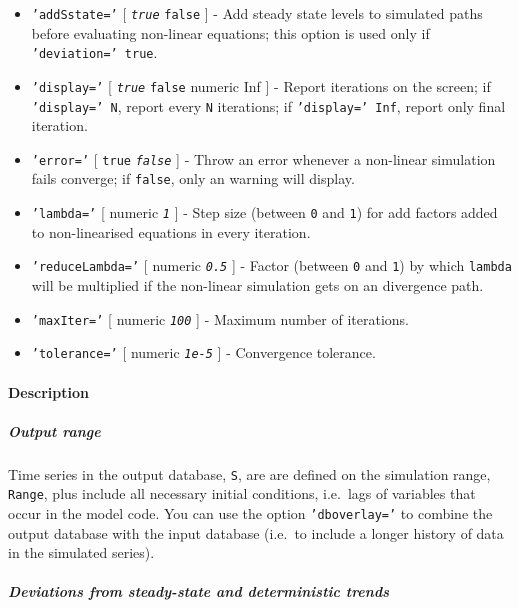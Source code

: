 \begin{itemize}
\item
  \texttt{'addSstate='} {[} \emph{\texttt{true}} \textbar{}
  \texttt{false} {]} - Add steady state levels to simulated paths before
  evaluating non-linear equations; this option is used only if
  \texttt{'deviation=' true}.
\item
  \texttt{'display='} {[} \emph{\texttt{true}} \textbar{} \texttt{false}
  \textbar{} numeric \textbar{} Inf {]} - Report iterations on the
  screen; if \texttt{'display=' N}, report every \texttt{N} iterations;
  if \texttt{'display=' Inf}, report only final iteration.
\item
  \texttt{'error='} {[} \texttt{true} \textbar{} \emph{\texttt{false}}
  {]} - Throw an error whenever a non-linear simulation fails converge;
  if \texttt{false}, only an warning will display.
\item
  \texttt{'lambda='} {[} numeric \textbar{} \emph{\texttt{1}} {]} - Step
  size (between \texttt{0} and \texttt{1}) for add factors added to
  non-linearised equations in every iteration.
\item
  \texttt{'reduceLambda='} {[} numeric \textbar{} \emph{\texttt{0.5}}
  {]} - Factor (between \texttt{0} and \texttt{1}) by which
  \texttt{lambda} will be multiplied if the non-linear simulation gets
  on an divergence path.
\item
  \texttt{'maxIter='} {[} numeric \textbar{} \emph{\texttt{100}} {]} -
  Maximum number of iterations.
\item
  \texttt{'tolerance='} {[} numeric \textbar{} \emph{\texttt{1e-5}} {]}
  - Convergence tolerance.
\end{itemize}

\paragraph{Description}\label{description}

\subparagraph{Output range}\label{output-range}

Time series in the output database, \texttt{S}, are are defined on the
simulation range, \texttt{Range}, plus include all necessary initial
conditions, i.e.~lags of variables that occur in the model code. You can
use the option \texttt{'dboverlay='} to combine the output database with
the input database (i.e.~to include a longer history of data in the
simulated series).

\subparagraph{Deviations from steady-state and deterministic
trends}\label{deviations-from-steady-state-and-deterministic-trends}

